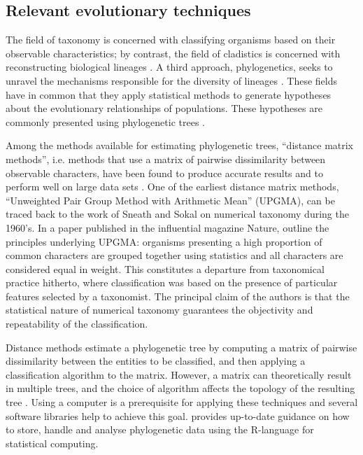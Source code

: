\subsection{Relevant evolutionary techniques}
The field of taxonomy is concerned with classifying organisms based on their observable characteristics; by contrast, the field of cladistics is concerned with reconstructing biological lineages \citep{Rohlf2013a}. A third approach, phylogenetics, seeks to unravel the mechanisms responsible for the diversity of lineages \citep{Garamszegi2014a}. These fields have in common that they apply statistical methods to generate hypotheses about the evolutionary relationships of populations. These hypotheses are commonly presented using phylogenetic trees \citep{Baum2008b}.

Among the methods available for estimating phylogenetic trees, “distance matrix methods”, i.e. methods that use a matrix of pairwise dissimilarity between observable characters, have been found to produce accurate results \citep{FelsensteinJ.andFelenstein2004a} and to perform well on large data sets \citep{Desper2005a}. One of the earliest distance matrix methods, “Unweighted Pair Group Method with Arithmetic Mean” (UPGMA), can be traced back to the work of Sneath and Sokal on numerical taxonomy during the 1960's. In a paper published in the influential magazine Nature, \citet{Sneath1962a} outline the principles underlying UPGMA: organisms presenting a high proportion of common characters are grouped together using statistics and all characters are considered equal in weight. This constitutes a departure from taxonomical practice hitherto, where classification was based on the presence of particular features selected by a taxonomist. The principal claim of the authors is that the statistical nature of numerical taxonomy guarantees the objectivity and repeatability of the classification.

Distance methods estimate a phylogenetic tree by computing a matrix of pairwise dissimilarity between the entities to be classified, and then applying a classification algorithm to the matrix. However, a matrix can theoretically result in multiple trees, and the choice of algorithm affects the topology of the resulting tree \citep{Paradis2011}. Using a computer is a prerequisite for applying these techniques and several software libraries help to achieve this goal. \citet{Paradis2011} provides up-to-date guidance on how to store, handle and analyse phylogenetic data using the R-language for statistical computing.

